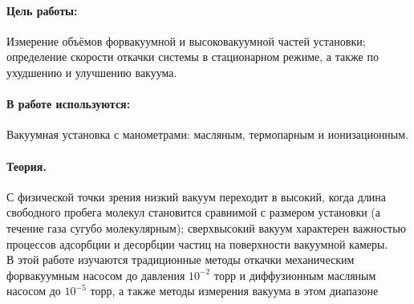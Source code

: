 \documentclass{letnab}
\begin{document}


\paragraph{Цель работы:}Измерение объёмов форвакуумной и высоковакуумной частей установки;  определение скорости откачки системы в стационарном режиме, а также по ухудшению и улучшению вакуума.
\paragraph{В работе используются:}Вакуумная установка с манометрами: масляным, термопарным и ионизационным.
\paragraph{Теория.} 
С физической точки зрения низкий вакуум переходит в высокий, когда длина свободного пробега молекул становится сравнимой с размером установки (а течение газа сугубо молекулярным); сверхвысокий вакуум характерен важностью процессов адсорбции и десорбции частиц на поверхности вакуумной камеры.\\
В этой работе изучаются традиционные методы откачки механическим форвакуумным насосом до давления $10^{-2}$ торр и диффузионным масляным насосом до $10^{-5}$ торр, а также методы измерения вакуума в этом диапазоне\\
\end{document}
